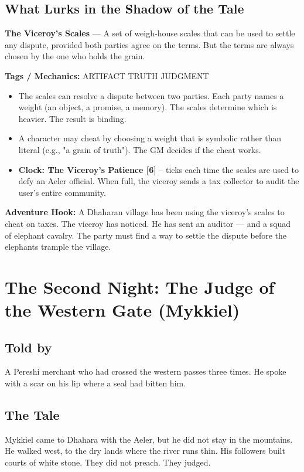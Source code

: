 \documentclass[10pt,twoside]{book}
\newcommand{\tag}[1]{\textsc{#1}}
\begin{document}
\section*{What Lurks in the Shadow of the Tale}
\begin{infobox}
\textbf{The Viceroy's Scales} --- A set of weigh‑house scales that can be used to settle any dispute, provided both parties agree on the terms. But the terms are always chosen by the one who holds the grain.

\textbf{Tags / Mechanics:} \tag{ARTIFACT} \tag{TRUTH} \tag{JUDGMENT}

\begin{itemize}
\item The scales can resolve a dispute between two parties. Each party names a weight (an object, a promise, a memory). The scales determine which is heavier. The result is binding.
\item A character may cheat by choosing a weight that is symbolic rather than literal (e.g., "a grain of truth"). The GM decides if the cheat works.
\item \textbf{Clock: The Viceroy's Patience [6]} -- ticks each time the scales are used to defy an Aeler official. When full, the viceroy sends a tax collector to audit the user's entire community.
\end{itemize}

\textbf{Adventure Hook:} A Dhaharan village has been using the viceroy's scales to cheat on taxes. The viceroy has noticed. He has sent an auditor --- and a squad of elephant cavalry. The party must find a way to settle the dispute before the elephants trample the village.
\end{infobox}

\chapter{The Second Night: The Judge of the Western Gate (Mykkiel)}

\section*{Told by}
A Pereshi merchant who had crossed the western passes three times. He spoke with a scar on his lip where a seal had bitten him.

\section*{The Tale}
Mykkiel came to Dhahara with the Aeler, but he did not stay in the mountains. He walked west, to the dry lands where the river runs thin. His followers built courts of white stone. They did not preach. They judged.
\end{document}

